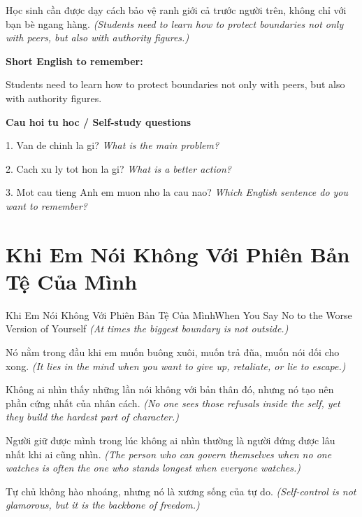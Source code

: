 \begin{baihoc}
Học sinh cần được dạy cách bảo vệ ranh giới cả trước người trên, không chỉ với bạn bè ngang hàng.
\textit{(Students need to learn how to protect boundaries not only with peers, but also with authority figures.)}
\end{baihoc}

\begin{ghinhoanh}
\textbf{Short English to remember:}

Students need to learn how to protect boundaries not only with peers, but also with authority figures.

\end{ghinhoanh}

\begin{tuhocnhanh}
\textbf{Cau hoi tu hoc / Self-study questions}

1. Van de chinh la gi? \textit{What is the main problem?}

2. Cach xu ly tot hon la gi? \textit{What is a better action?}

3. Mot cau tieng Anh em muon nho la cau nao? \textit{Which English sentence do you want to remember?}
\end{tuhocnhanh}
\ngancach

\section{Khi Em Nói Không Với Phiên Bản Tệ Của Mình}
\begin{truyen}{Khi Em Nói Không Với Phiên Bản Tệ Của Mình}{When You Say No to the Worse Version of Yourself}
\textit{(At times the biggest boundary is not outside.)}

Nó nằm trong đầu khi em muốn buông xuôi, muốn trả đũa, muốn nói dối cho xong.
\textit{(It lies in the mind when you want to give up, retaliate, or lie to escape.)}

Không ai nhìn thấy những lần nói không với bản thân đó, nhưng nó tạo nên phần cứng nhất của nhân cách.
\textit{(No one sees those refusals inside the self, yet they build the hardest part of character.)}

Người giữ được mình trong lúc không ai nhìn thường là người đứng được lâu nhất khi ai cũng nhìn.
\textit{(The person who can govern themselves when no one watches is often the one who stands longest when everyone watches.)}

Tự chủ không hào nhoáng, nhưng nó là xương sống của tự do.
\textit{(Self-control is not glamorous, but it is the backbone of freedom.)}

\end{truyen}

